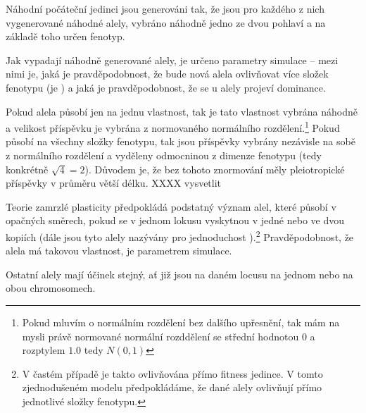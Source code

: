 Náhodní počáteční jedinci jsou generováni tak, že jsou pro každého z nich vygenerované náhodné alely, vybráno náhodně
jedno ze dvou pohlaví a na základě toho určen fenotyp.

Jak vypadají náhodně generované alely, je určeno parametry simulace -- mezi nimi je, jaká je pravděpodobnost, že bude
nová alela ovlivňovat více složek fenotypu (je ) a jaká je pravděpodobnost, že se u alely projeví
dominance.

Pokud alela působí jen na jednu vlastnost, tak je tato vlastnost vybrána náhodně a velikost příspěvku je vybrána z
normovaného normálního rozdělení.\footnote{Pokud mluvím o normálním rozdělení bez dalšího upřesnění, tak mám na mysli
právě normované normální rozddělení se střední hodnotou $0$ a rozptylem $1.0$ tedy $N(0, 1)$}
Pokud působí na všechny složky fenotypu, tak jsou příspěvky vybrány nezávisle na sobě z normálního
rozdělení a vyděleny odmocninou z dimenze fenotypu (tedy konkrétně $\sqrt{4} = 2$).
Důvodem je, že bez tohoto znormování měly pleiotropické příspěvky v průměru větší délku. XXXX vysvetlit

Teorie zamrzlé plasticity předpokládá podstatný význam alel, které působí v opačných směrech, pokud se
v jednom lokusu vyskytnou v jedné nebo ve dvou kopiích (dále jsou tyto alely nazývány pro jednoduchost
).\footnote{
V častém případě je takto ovlivňována přímo fitness jedince. V tomto zjednodušeném modelu předpokládáme, že dané alely
ovlivňují přímo jednotlivé složky fenotypu.
} Pravděpodobnost, že alela má takovou vlastnost, je parametrem simulace.

Ostatní alely mají účinek stejný, ať již jsou na daném locusu na jednom nebo na obou chromosomech.

